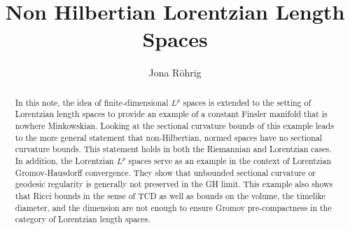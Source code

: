 \documentclass[11pt, a4paper]{article} %
\title{Non Hilbertian Lorentzian Length Spaces}
\author{Jona Röhrig}
\theoremstyle{plain} %
\begin{document}
\maketitle
\begin{abstract}
In this note, the idea of finite-dimensional $L^p$ spaces is extended to the setting of Lorentzian length spaces to provide an example of a constant Finsler manifold that is nowhere Minkowskian. Looking at the sectional curvature bounds of this example leads to the more general statement that non-Hilbertian, normed spaces have no sectional curvature bounds. This statement holds in both the Riemannian and Lorentzian cases.
In addition, the Lorentzian $L^p$ spaces serve as an example in the context of Lorentzian Gromov-Hausdorff convergence. They show that unbounded sectional curvature or geodesic regularity is generally not preserved in the GH limit. 
This example also shows that Ricci bounds in the sense of TCD as well as bounds on the volume, the timelike diameter, and the dimension are not enough to ensure Gromov pre-compactness in the category of Lorentzian length spaces.
\end{abstract}
\end{document}
